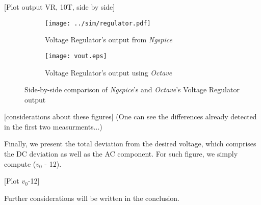 [Plot output VR, 10T, side by side]
\begin{figure}[H]
\centering
\begin{subfigure}{.5\textwidth}
  \centering
  \texttt{[image: ../sim/regulator.pdf]}
  \caption{Voltage Regulator's output from \textit{Ngspice}}
  \label{fig:RegulatorNGSPICE}
\end{subfigure}%
\begin{subfigure}{.5\textwidth}
  \centering
  \texttt{[image: vout.eps]}
  \caption{Voltage Regulator's output using \textit{Octave}}
  \label{fig:RegulatorOCTAVE}
\end{subfigure}
\caption{Side-by-side comparison of \textit{Ngspice}'s and \textit{Octave}'s Voltage Regulator output}
\label{fig:RegulatorComparacao}
\end{figure}

[considerations about these figures]
(One can see the differences already detected in the first two measurments...)

Finally, we present the total deviation from the desired voltage, which comprises the DC deviation as well as the AC component. For such figure, we simply compute ($v_0$ - 12).


[Plot $v_0$-12]

Further considerations will be written in the conclusion.
